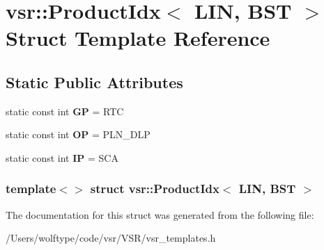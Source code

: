 \hypertarget{structvsr_1_1_product_idx_3_01_l_i_n_00_01_b_s_t_01_4}{\section{vsr\-:\-:Product\-Idx$<$ L\-I\-N, B\-S\-T $>$ Struct Template Reference}
\label{structvsr_1_1_product_idx_3_01_l_i_n_00_01_b_s_t_01_4}
}
\subsection*{Static Public Attributes}
\begin{DoxyCompactItemize}
\item 
\hypertarget{structvsr_1_1_product_idx_3_01_l_i_n_00_01_b_s_t_01_4_a34040cc9ab736a01fe0aecba20a60372}{static const int {\bfseries G\-P} = R\-T\-C}\label{structvsr_1_1_product_idx_3_01_l_i_n_00_01_b_s_t_01_4_a34040cc9ab736a01fe0aecba20a60372}

\item 
\hypertarget{structvsr_1_1_product_idx_3_01_l_i_n_00_01_b_s_t_01_4_a7adc0e78ab6fb488bcbf6225c1b5013e}{static const int {\bfseries O\-P} = P\-L\-N\-\_\-\-D\-L\-P}\label{structvsr_1_1_product_idx_3_01_l_i_n_00_01_b_s_t_01_4_a7adc0e78ab6fb488bcbf6225c1b5013e}

\item 
\hypertarget{structvsr_1_1_product_idx_3_01_l_i_n_00_01_b_s_t_01_4_a77ad7e5801e23ee8b6fb3eb53e542e76}{static const int {\bfseries I\-P} = S\-C\-A}\label{structvsr_1_1_product_idx_3_01_l_i_n_00_01_b_s_t_01_4_a77ad7e5801e23ee8b6fb3eb53e542e76}

\end{DoxyCompactItemize}
\subsubsection*{template$<$$>$ struct vsr\-::\-Product\-Idx$<$ L\-I\-N, B\-S\-T $>$}



The documentation for this struct was generated from the following file\-:\begin{DoxyCompactItemize}
\item 
/\-Users/wolftype/code/vsr/\-V\-S\-R/vsr\-\_\-templates.\-h\end{DoxyCompactItemize}
